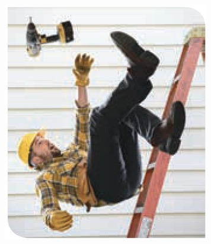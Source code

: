 \documentclass[11pt]{book}
\begin{document}
\begin{minipage}[t]{0.35\textwidth}
\begin{figure}[H]
    \includegraphics[width=\linewidth]{f_gravitacional}
    \label{fig:f_gravitacional}
  \end{figure}
\end{minipage}\hfill
\end{document}
